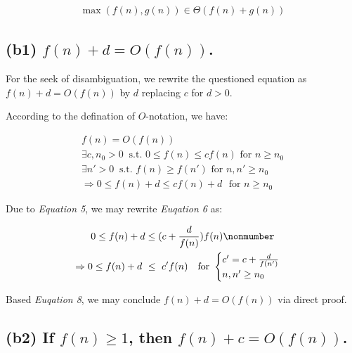 \documentclass[12pt]{article}
\begin{document}
\begin{gather}
    \max(f(n), g(n)) \in \Theta (f(n) + g(n))
\end{gather}


\subsection{(b1) $f(n) + d = O(f(n))$.}

For the seek of disambiguation, we rewrite the questioned equation as $f(n) + d = O(f(n))$ by $d$ replacing $c$ for $d > 0$.


According to the defination of $O$-notation, we have:

\begin{gather}
    f(n) = O(f(n)) \nonumber\\
    \exists c, n_{0} > 0 \ \text{ s.t.  $0 \leq f(n) \leq cf(n)$ \ \ \ for $n \geq n_{0}$} \\
    \exists n' > 0 \ \text{ s.t.  $f(n) \geq f(n')$ \ \ \ for $n, n' \geq n_{0}$} \\
    \Rightarrow 0 \leq f(n)+d \leq cf(n) + d \ \ \ \text{for $n \geq n_{0}$}
\end{gather}

Due to \textit{Equation 5}, we may rewrite \textit{Euqation 6} as:


\begin{gather}
    0 \leq f(n)+d \leq (c + \frac{d}{f(n)})f(n) \nonmumber\\
    \Rightarrow 0 \leq f(n)+d \ \leq \ c'f(n) \ \ \ \text{for } \begin{cases}
                    c' = c + \frac{d}{f(n')} \\
                    n, n' \geq n_{0}
                \end{cases}
\end{gather}

Based \textit{Euqation 8}, we may conclude $f(n) + d = O(f(n))$ via direct proof.


\subsection{(b2) If $f(n) \geq 1$, then $f(n) + c = O(f(n))$.}
\end{document}
